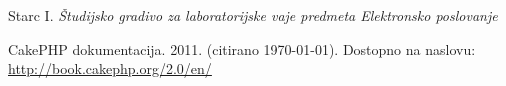 \documentclass[a4paper,12pt]{report}
\begin{document}
\begin{thebibliography}{99}
\addtocounter{chapter}{1}

 Starc I. \emph{Študijsko gradivo za laboratorijske vaje predmeta Elektronsko poslovanje}

 CakePHP dokumentacija. 2011. (citirano \today). Dostopno na naslovu:
\url{http://book.cakephp.org/2.0/en/}


\end{thebibliography}



\end{document}
